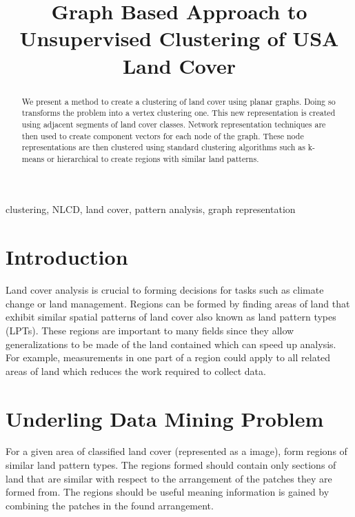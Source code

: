 \documentclass[conference]{IEEEtran}
\begin{document}
	
	\title{Graph Based Approach to Unsupervised Clustering of USA Land Cover}
	
	\author{
	}
	
	\maketitle
	
	\begin{abstract}
		We present a method to create a clustering of land cover using planar graphs. Doing so transforms the problem into a vertex clustering one. This new representation is created using adjacent segments of land cover classes. Network representation techniques are then used to create component vectors for each node of the graph. These node representations are then clustered using standard clustering algorithms such as k-means or hierarchical to create regions with similar land patterns.
	\end{abstract}
	
	\begin{IEEEkeywords}
		clustering, NLCD, land cover, pattern analysis, graph representation
	\end{IEEEkeywords}
	
	\section{Introduction}
	Land cover analysis is crucial to forming decisions for tasks such as climate change or land management\cite{doi:10.1080/13658816.2015.1134796}. Regions can be formed by finding areas of land that exhibit similar spatial patterns of land cover also known as land pattern types (LPTs). These regions are important to many fields since they allow generalizations to be made of the land contained which can speed up analysis\cite{doi:10.1080/13658816.2015.1134796}. For example, measurements in one part of a region could apply to all related areas of land which reduces the work required to collect data.
	
	\section{Underling Data Mining Problem}
	For a given area of classified land cover (represented as a image), form regions of similar land pattern types. The regions formed should contain only sections of land that are similar with respect to the arrangement of the patches they are formed from. The regions should be useful meaning information is gained by combining the patches in the found arrangement.
	
\end{document}
